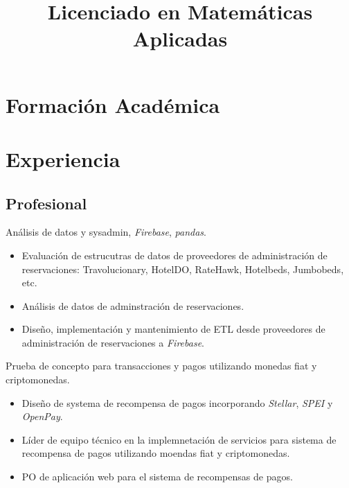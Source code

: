 \documentclass[11pt,letter]{moderncv}
\title{Licenciado en Matemáticas Aplicadas}
\begin{document}
\makecvtitle

\section{Formación Académica}
\label{sec:formacion-academica}


\section{Experiencia}
\label{sec:experiencia}
\subsection{Profesional}
\label{sec:profesional}



 {Análisis de datos y sysadmin, \emph{Firebase}, \emph{pandas}.
  \begin{itemize}
  \item Evaluación de estrucutras de datos de proveedores de administración de reservaciones: Travolucionary, HotelDO, RateHawk, Hotelbeds, Jumbobeds, etc.
  \item Análisis de datos de adminstración de reservaciones.
  \item Diseño, implementación y mantenimiento de ETL desde proveedores de administración de reservaciones a \emph{Firebase}.
  \end{itemize}
}

 {Prueba de concepto para transacciones y pagos utilizando monedas fiat y criptomonedas.
  \begin{itemize}
  \item Diseño de systema de recompensa de pagos incorporando \emph{Stellar}, \emph{SPEI} y \emph{OpenPay}.
  \item Líder de equipo técnico en la implemnetación de servicios para sistema de recompensa de pagos utilizando moendas fiat y criptomonedas.
  \item PO de aplicación web para el sistema de recompensas de pagos.
  \end{itemize}
}
\end{document}
